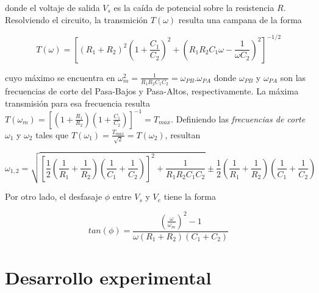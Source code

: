\documentclass[11pt,a4paper]{article}
\begin{document}
donde el voltaje de salida $V_s$ es la caída de potencial sobre la resistencia $R$. Resolviendo el circuito, la transmición $T(\omega)$ resulta una campana de la forma

\begin{equation}
T(\omega) = [(R_1+R_2)^2(1+\frac{C_1}{C_2})^2+(R_1R_2C_1\omega-\frac{1}{\omega C_2})^2]^{-1/2}
\label{trans_PBanda}
\end{equation}

cuyo máximo se encuentra en $\omega_m^2 = \frac{1}{R_1R_2C_1C_2} = \omega_{PB}.\omega_{PA}$ donde $\omega_{PB}$ y $\omega_{PA}$ son las frecuencias de corte del Pasa-Bajos y Pasa-Altos, respectivamente. La máxima transmisión para esa frecuencia resulta $T(\omega_m) = [(1+\frac{R_1}{R_2})(1+\frac{C_1}{C_2})]^{-1} = T_{max}$. Definiendo las \textit{frecuencias de corte}\cite{Trelles} $\omega_1$ y $\omega_2$ tales que $T(\omega_1) = \frac{T_{max}}{\sqrt{2}} = T(\omega_2)$, resultan

\begin{equation}
\omega_{1,2} = \sqrt{[\frac{1}{2}(\frac{1}{R_1}+\frac{1}{R_2})(\frac{1}{C_1}+\frac{1}{C_2})]^2+\frac{1}{R_1R_2C_1C_2}} \pm \frac{1}{2}(\frac{1}{R_1}+\frac{1}{R_2})(\frac{1}{C_1}+\frac{1}{C_2})
\label{corte_PBanda}
\end{equation}

Por otro lado, el desfasaje $\phi$ entre $V_s$ y $V_e$ tiene la forma

\begin{equation}
tan(\phi) = \frac{(\frac{\omega}{\omega_m})^2-1}{\omega (R_1+R_2)(C_1+C_2)}
\label{des_PBanda}
\end{equation}


\section{Desarrollo experimental}
\end{document}

